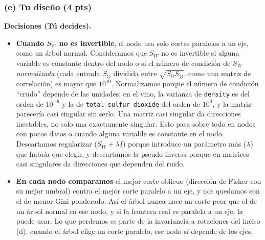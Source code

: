 \documentclass[11pt, letterpaper]{article}
\begin{document}
\subsubsection*{(e) Tu diseño (4 pts)}

\textbf{Decisiones (Tú decides).}
\begin{itemize}
    \item \textbf{Cuando $S_W$ no es invertible}, el nodo usa solo cortes paralelos a un eje, como un árbol normal. Consideramos que $S_W$ no es invertible si alguna variable es constante dentro del nodo o si el número de condición de $S_W$ \emph{normalizada} (cada entrada $S_{ij}$ dividida entre $\sqrt{S_{ii}S_{jj}}$, como una matriz de correlación) es mayor que $10^{10}$. Normalizamos porque el número de condición ``crudo'' depende de las unidades: en el vino, la varianza de \texttt{density} es del orden de $10^{-6}$ y la de \texttt{total sulfur dioxide} del orden de $10^{3}$, y la matriz parecería casi singular sin serlo. Una matriz casi singular da direcciones inestables, no solo una exactamente singular. Esto pasa sobre todo en nodos con pocos datos o cuando alguna variable es constante en el nodo. Descartamos regularizar ($S_W + \lambda I$) porque introduce un parámetro más ($\lambda$) que habría que elegir, y descartamos la pseudo-inversa porque en matrices casi singulares da direcciones que dependen del ruido.
    \item \textbf{En cada nodo comparamos} el mejor corte oblicuo (dirección de Fisher con su mejor umbral) contra el mejor corte paralelo a un eje, y nos quedamos con el de menor Gini ponderado. Así el árbol nunca hace un corte peor que el de un árbol normal en ese nodo, y si la frontera real es paralela a un eje, la puede usar. Lo que perdemos es parte de la invariancia a rotaciones del inciso (d): cuando el árbol elige un corte paralelo, ese nodo sí depende de los ejes.
\end{itemize}
\end{document}
